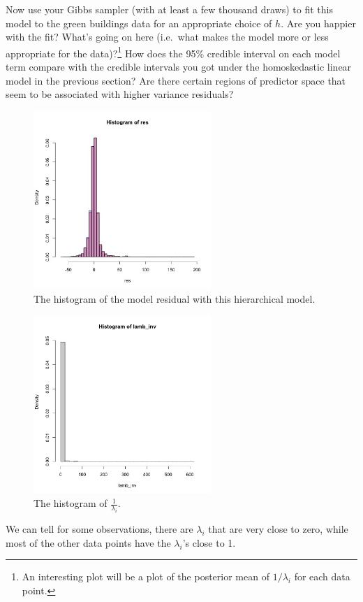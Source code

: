 \documentclass[11pt]{article}
\begin{document}
\begin{enumerate}[(A)]
Now use your Gibbs sampler (with at least a few thousand draws) to fit this model to the green buildings data for an appropriate choice of $h$.  Are you happier with the fit?  What's going on here (i.e.~what makes the model more or less appropriate for the data)?\footnote{An interesting plot will be a plot of the posterior mean of $1/\lambda_i$ for each data point.}  How does the 95\% credible interval on each model term compare with the credible intervals you got under the homoskedastic linear model in the previous section?  Are there certain regions of predictor space that seem to be associated with higher variance residuals?  

\bigskip
\begin{figure}[h]
    \centering
    \includegraphics[width=0.6\textwidth]{Ex3/figures/res_gibbs.jpeg}
    \caption{The histogram of the model residual with this hierarchical model.}
    \label{fig:hist_res}
\end{figure}

\begin{figure}[h]
    \centering
    \includegraphics[width=0.6\textwidth]{Ex3/figures/lamb_inv.jpeg}
    \caption{The histogram of $\frac{1}{\lambda_i}$.}
    \label{fig:hist_res}
\end{figure}

We can tell for some observations, there are $\lambda_i$ that are very close to zero, while most of the other data points have the $\lambda_i$'s close to 1.

\end{enumerate}
\end{document}

